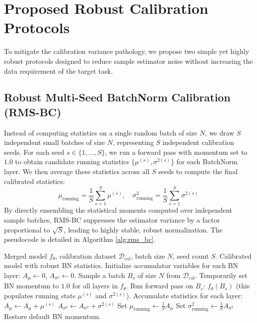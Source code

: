 \documentclass{article}
\begin{document}
\section{Proposed Robust Calibration Protocols}
To mitigate the calibration variance pathology, we propose two simple yet highly robust protocols designed to reduce sample estimator noise without increasing the data requirement of the target task.

\subsection{Robust Multi-Seed BatchNorm Calibration (RMS-BC)}
Instead of computing statistics on a single random batch of size $N$, we draw $S$ independent small batches of size $N$, representing $S$ independent calibration seeds. For each seed $s \in \{1, \dots, S\}$, we run a forward pass with momentum set to $1.0$ to obtain candidate running statistics $\{\mu^{(s)}, \sigma^{2(s)}\}$ for each BatchNorm layer. We then average these statistics across all $S$ seeds to compute the final calibrated statistics:
\begin{equation}
    \mu_{\text{running}} = \frac{1}{S} \sum_{s=1}^S \mu^{(s)}, \quad \sigma^2_{\text{running}} = \frac{1}{S} \sum_{s=1}^S \sigma^{2(s)}
\end{equation}
By directly ensembling the statistical moments computed over independent sample batches, RMS-BC suppresses the estimator variance by a factor proportional to $\sqrt{S}$, leading to highly stable, robust normalization. The pseudocode is detailed in Algorithm \ref{alg:rms_bc}.

\begin{algorithm}[tb]
\caption{Robust Multi-Seed BatchNorm Calibration (RMS-BC)}
\label{alg:rms_bc}
\begin{algorithmic}[1]
 Merged model $f_\theta$, calibration dataset $\mathcal{D}_{\text{cal}}$, batch size $N$, seed count $S$.
 Calibrated model with robust BN statistics.
\STATE Initialize accumulator variables for each BN layer: $A_{\mu} \leftarrow 0$, $A_{\sigma^2} \leftarrow 0$.
    \STATE Sample a batch $B_s$ of size $N$ from $\mathcal{D}_{\text{cal}}$.
    \STATE Temporarily set BN momentum to $1.0$ for all layers in $f_\theta$.
    \STATE Run forward pass on $B_s$: $f_\theta(B_s)$ (this populates running stats $\mu^{(s)}$ and $\sigma^{2(s)}$).
    \STATE Accumulate statistics for each layer:
    \STATE $A_{\mu} \leftarrow A_{\mu} + \mu^{(s)}$
    \STATE $A_{\sigma^2} \leftarrow A_{\sigma^2} + \sigma^{2(s)}$
\ENDFOR
{}
    \STATE Set $\mu_{\text{running}} \leftarrow \frac{1}{S} A_{\mu}$
    \STATE Set $\sigma^2_{\text{running}} \leftarrow \frac{1}{S} A_{\sigma^2}$
    \STATE Restore default BN momentum.
\ENDFOR
\end{algorithmic}
\end{algorithm}
\end{document}
